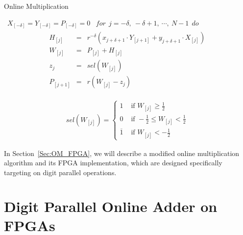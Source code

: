 \documentclass[conference]{IEEEtran}
\begin{document}
\begin{algorithm}[tbp]
  \caption{Online Multiplication}
  \begin{algorithmic}[1]
    \REQUIRE~$X_{[-\delta]}=Y_{[-\delta]}=P_{[-\delta]}=0$
    \ENSURE~$for~~ j=-\delta,~-\delta+1,~\cdots,~N-1 ~~do$
      \begin{eqnarray}\label{Eq:OnlineMult_General}
        \begin{matrix}
          H_{[j]}   & = & r^{-\delta}\left(x_{j+\delta+1}\cdot Y_{[j+1]}+y_{j+\delta+1}\cdot X_{[j]}\right)\\
          W_{[j]}   & = & P_{[j]} + H_{[j]}\\
          z_j       & = & sel(W_{[j]})\\
          P_{[j+1]} & = & r\left(W_{[j]}-z_j\right)
        \end{matrix}
      \end{eqnarray}
  \label{Algorithm:OnlineMult}
  \vspace{-2ex}
  \end{algorithmic}
\end{algorithm}

\begin{eqnarray}\label{Eq:SelFunc_OM}
  sel(W_{[j]})=\begin{cases}
    1 & \text{ if } W_{[j]} \geqslant \frac{1}{2} \\
    0 & \text{ if } -\frac{1}{2}\leqslant W_{[j]}<\frac{1}{2} \\
    \overline{1} & \text{ if } W_{[j]}<-\frac{1}{2}
  \end{cases}
\end{eqnarray}

In Section~\ref{Sec:OM_FPGA}, we will describe a modified online multiplication algorithm and its FPGA implementation, which are designed specifically targeting on digit parallel operations.



\section{Digit Parallel Online Adder on FPGAs}\label{Sec:OA_FPGA}
\end{document}
